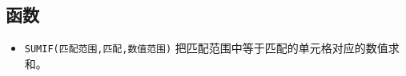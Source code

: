 
\begin{issues}
\issueDraft
\end{issues}

\subsection{函数}
\begin{itemize}
\item \verb|SUMIF(匹配范围,匹配,数值范围)| 把匹配范围中等于匹配的单元格对应的数值求和。
\end{itemize}
